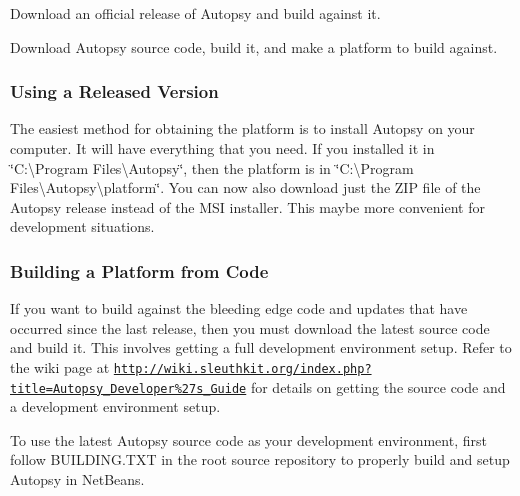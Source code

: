\begin{DoxyItemize}
\item Download an official release of Autopsy and build against it.
\item Download Autopsy source code, build it, and make a platform to build against.
\end{DoxyItemize}\hypertarget{mod_dev_page_mod_dev_setup_platform_rel}{}\subsubsection{Using a Released Version}\label{mod_dev_page_mod_dev_setup_platform_rel}
The easiest method for obtaining the platform is to install Autopsy on your computer. It will have everything that you need. If you installed it in \char`\"{}\+C\+:\textbackslash{}\+Program Files\textbackslash{}\+Autopsy\char`\"{}, then the platform is in \char`\"{}\+C\+:\textbackslash{}\+Program Files\textbackslash{}\+Autopsy\textbackslash{}platform\char`\"{}. You can now also download just the Z\+IP file of the Autopsy release instead of the M\+SI installer. This maybe more convenient for development situations.\hypertarget{mod_dev_page_mod_dev_setup_platform_src}{}\subsubsection{Building a Platform from Code}\label{mod_dev_page_mod_dev_setup_platform_src}
If you want to build against the bleeding edge code and updates that have occurred since the last release, then you must download the latest source code and build it. This involves getting a full development environment setup. Refer to the wiki page at \href{http://wiki.sleuthkit.org/index.php?title=Autopsy_Developer%27s_Guide}{\tt http\+://wiki.\+sleuthkit.\+org/index.\+php?title=\+Autopsy\+\_\+\+Developer\%27s\+\_\+\+Guide} for details on getting the source code and a development environment setup.

To use the latest Autopsy source code as your development environment, first follow B\+U\+I\+L\+D\+I\+N\+G.\+T\+XT in the root source repository to properly build and setup Autopsy in Net\+Beans.

